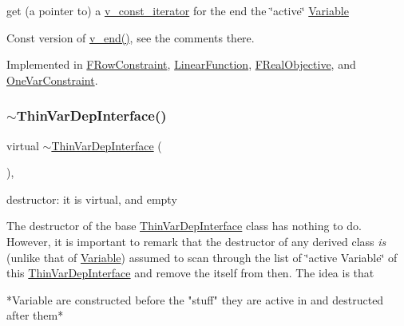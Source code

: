 get (a pointer to) a \mbox{\hyperlink{class_s_m_spp__di__unipi__it_1_1_thin_var_dep_interface_1_1v__const__iterator}{v\+\_\+const\+\_\+iterator}} for the end the \char`\"{}active\char`\"{} \mbox{\hyperlink{class_s_m_spp__di__unipi__it_1_1_variable}{Variable}} 

Const version of \mbox{\hyperlink{group___thin_var_dep_interface___c_l_a_s_s_e_s_ga422dd4393326b2da21dbef0aa0a85bee}{v\+\_\+end()}}, see the comments there. 

Implemented in \mbox{\hyperlink{class_s_m_spp__di__unipi__it_1_1_f_row_constraint_a17969277c912e791df025c9bebda3217}{F\+Row\+Constraint}}, \mbox{\hyperlink{class_s_m_spp__di__unipi__it_1_1_linear_function_abb9e25cdff71595b6c21f36db96242b0}{Linear\+Function}}, \mbox{\hyperlink{class_s_m_spp__di__unipi__it_1_1_f_real_objective_a17969277c912e791df025c9bebda3217}{F\+Real\+Objective}}, and \mbox{\hyperlink{class_s_m_spp__di__unipi__it_1_1_one_var_constraint_a17969277c912e791df025c9bebda3217}{One\+Var\+Constraint}}.

\mbox{\label{group___thin_var_dep_interface___c_l_a_s_s_e_s_ga627c883f11bd4f9b137b397be90d3996}} 
\subsubsection{\texorpdfstring{$\sim$\+Thin\+Var\+Dep\+Interface()}{~ThinVarDepInterface()}}
{\footnotesize\ttfamily virtual $\sim$\mbox{\hyperlink{class_s_m_spp__di__unipi__it_1_1_thin_var_dep_interface}{Thin\+Var\+Dep\+Interface}} (\begin{DoxyParamCaption}{ }\end{DoxyParamCaption})\hspace{0.3cm}{\ttfamily [inline]}, {\ttfamily [virtual]}}



destructor\+: it is virtual, and empty 

The destructor of the base \mbox{\hyperlink{class_s_m_spp__di__unipi__it_1_1_thin_var_dep_interface}{Thin\+Var\+Dep\+Interface}} class has nothing to do. However, it is important to remark that the destructor of any derived class {\itshape is} (unlike that of \mbox{\hyperlink{class_s_m_spp__di__unipi__it_1_1_variable}{Variable}}) assumed to scan through the list of \char`\"{}active Variable\char`\"{} of this \mbox{\hyperlink{class_s_m_spp__di__unipi__it_1_1_thin_var_dep_interface}{Thin\+Var\+Dep\+Interface}} and remove the itself from then. The idea is that \begin{DoxyVerb}*Variable are constructed before the "stuff" they are active
 in and destructed after them*
\end{DoxyVerb}


